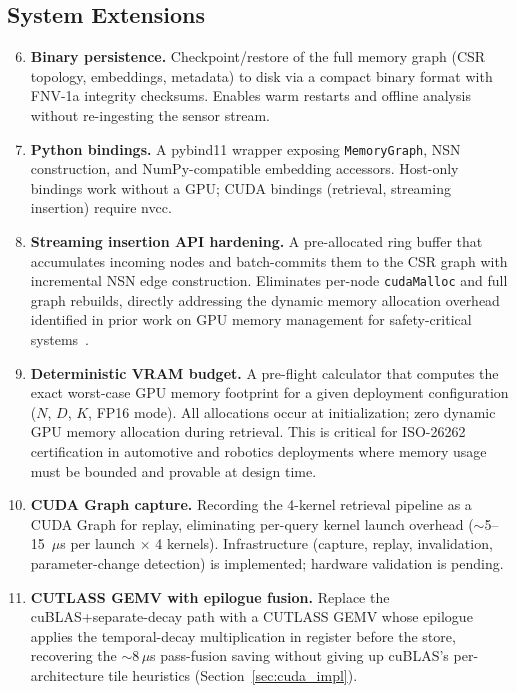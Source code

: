 \documentclass[11pt]{article}
\begin{document}
\subsection*{System Extensions}

\begin{enumerate}
\setcounter{enumi}{5}
\item \textbf{Binary persistence.} Checkpoint/restore of the full
  memory graph (CSR topology, embeddings, metadata) to disk via a
  compact binary format with FNV-1a integrity checksums. Enables warm
  restarts and offline analysis without re-ingesting the sensor stream.

\item \textbf{Python bindings.} A pybind11 wrapper exposing
  \texttt{MemoryGraph}, NSN construction, and NumPy-compatible embedding
  accessors. Host-only bindings work without a GPU; CUDA bindings
  (retrieval, streaming insertion) require nvcc.

\item \textbf{Streaming insertion API hardening.} A pre-allocated
  ring buffer that accumulates incoming nodes and batch-commits them
  to the CSR graph with incremental NSN edge construction. Eliminates
  per-node \texttt{cudaMalloc} and full graph rebuilds, directly
  addressing the dynamic memory allocation overhead identified in
  prior work on GPU memory management for safety-critical
  systems~\cite{calderon2024xerozerox}.

\item \textbf{Deterministic VRAM budget.} A pre-flight calculator that
  computes the exact worst-case GPU memory footprint for a given
  deployment configuration ($N$, $D$, $K$, FP16 mode). All allocations
  occur at initialization; zero dynamic GPU memory allocation during
  retrieval. This is critical for ISO-26262 certification in automotive
  and robotics deployments where memory usage must be bounded and
  provable at design time.

\item \textbf{CUDA Graph capture.} Recording the 4-kernel retrieval
  pipeline as a CUDA Graph for replay, eliminating per-query kernel
  launch overhead ($\sim$5--15~$\mu$s per launch $\times$ 4 kernels).
  Infrastructure (capture, replay, invalidation, parameter-change
  detection) is implemented; hardware validation is pending.

\item \textbf{CUTLASS GEMV with epilogue fusion.} Replace the
  cuBLAS+separate-decay path with a CUTLASS GEMV whose epilogue
  applies the temporal-decay multiplication in register before the
  store, recovering the $\sim$8\,$\mu$s pass-fusion saving without
  giving up cuBLAS's per-architecture tile heuristics
  (Section~\ref{sec:cuda_impl}).


\end{enumerate}
\end{document}
